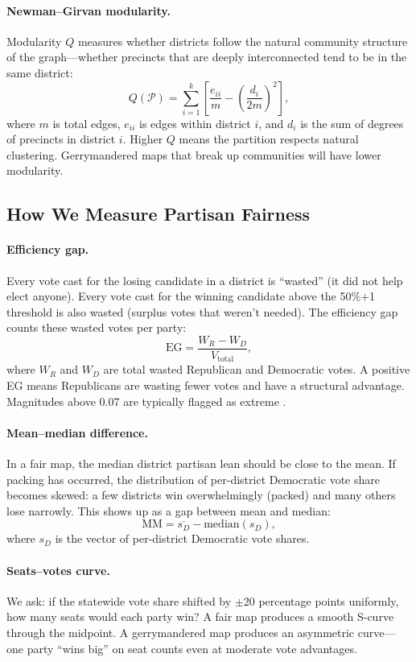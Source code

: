 \documentclass[11pt]{article}
\begin{document}
\paragraph{Newman--Girvan modularity.} Modularity $Q$ measures whether
districts follow the natural community structure of the graph---whether
precincts that are deeply interconnected tend to be in the same
district:
\[
  Q(\mathcal{P})
  = \sum_{i=1}^{k}
    \left[ \frac{e_{ii}}{m} - \left( \frac{d_i}{2m} \right)^2 \right],
\]
where $m$ is total edges, $e_{ii}$ is edges within district $i$, and
$d_i$ is the sum of degrees of precincts in district $i$. Higher $Q$
means the partition respects natural clustering. Gerrymandered maps that
break up communities will have lower modularity.

\subsection{How We Measure Partisan Fairness}

\paragraph{Efficiency gap.} Every vote cast for the losing candidate in
a district is ``wasted'' (it did not help elect anyone). Every vote cast
for the winning candidate above the 50\%+1 threshold is also wasted
(surplus votes that weren't needed). The efficiency gap counts
these wasted votes per party:
\[
  \mathrm{EG} = \frac{W_R - W_D}{V_{\text{total}}},
\]
where $W_R$ and $W_D$ are total wasted Republican and Democratic votes.
A positive EG means Republicans are wasting fewer votes and have a
structural advantage. Magnitudes above 0.07 are typically flagged as
extreme \cite{stephanopoulos2015}.

\paragraph{Mean--median difference.} In a fair map, the median district
partisan lean should be close to the mean. If packing has occurred, the
distribution of per-district Democratic vote share becomes skewed: a
few districts win overwhelmingly (packed) and many others lose narrowly.
This shows up as a gap between mean and median:
\[
  \mathrm{MM} = \overline{s_D} - \mathrm{median}(s_D),
\]
where $s_D$ is the vector of per-district Democratic vote shares.

\paragraph{Seats--votes curve.} We ask: if the statewide vote share
shifted by $\pm 20$ percentage points uniformly, how many seats would
each party win? A fair map produces a smooth S-curve through the
midpoint. A gerrymandered map produces an asymmetric curve---one party
``wins big'' on seat counts even at moderate vote advantages.
\end{document}
